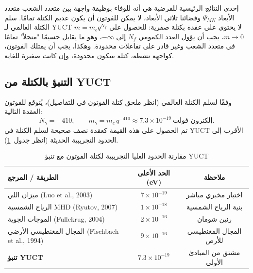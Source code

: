 \documentclass[11pt,a4paper]{article}
\begin{document}
	إحدى النتائج الرئيسية للفرضية هي أنه للوفاء بوظيفة واجهة بين متعدد الشعب متعدد الأبعاد $\Psi_{MN}$ وفضائنا ثلاثي الأبعاد، لا يمكن للفوتون أن يكون عديم الكتلة تمامًا. سلم الكتلة العالمي لـ YUCT $m = m_e q^{N_f}$ لا يحتوي على عقدة بكتلة صفرية: للحصول على $m \to 0$، يجب أن يؤول العدد الكمومي $N_f$ إلى $-\infty$، وهو ما يقابل جسيمًا "منحلاً" تمامًا في متعدد الشعب وغير قادر على تفاعلات محدودة. وهكذا، يجب أن يمتلك الفوتون، كواجهة نشطة، كتلة سكون محدودة، وإن كانت صغيرة للغاية.
	
	\subsection{التنبؤ بالكتلة من YUCT}
	وفقًا لسلم الكتلة العالمي (انظر ملحق كتلة الفوتون في \cite{yuct_zenodo} للتفاصيل)، يُتوقع للفوتون العقدة التالية:
	\begin{equation}
		\boxed{N_\gamma = -410}, \qquad
		\boxed{m_\gamma = m_e \, q^{-410} \approx 7.3 \times 10^{-19}~\text{إلكترون فولت}} .
	\end{equation}
	تم الحصول على هذه القيمة كعقدة نصف صحيحة لسلم الكتلة في YUCT الأقرب إلى الحدود التجريبية الحديثة (انظر جدول~\ref{tab:photon_limits}).
	
	\begin{table}[h!]
		\centering
		\caption{مقارنة الحدود العليا التجريبية لكتلة الفوتون مع تنبؤ YUCT}
		\label{tab:photon_limits}
		\small
		\begin{tabular}{lcc}
			\toprule
			\textbf{الطريقة / المرجع} & \textbf{الحد الأعلى (eV)} & \textbf{ملاحظة} \\
			\midrule
			ميزان اللي (Luo et al., 2003) & $7\times10^{-19}$ & اختبار مخبري مباشر \\
			الرياح الشمسية MHD (Ryutov, 2007) & $1\times10^{-18}$ & بنية الرياح الشمسية \\
			الموجات الجوية (Fullekrug, 2004) & $2\times10^{-16}$ & رنين شومان \\
			المجال المغنطيسي الأرضي (Fischbach et al., 1994) & $9\times10^{-16}$ & المجال المغنطيسي للأرض \\
			\midrule
			\textbf{تنبؤ YUCT} & \textbf{$7.3\times10^{-19}$} & مشتق من المبادئ الأولى \\
			\bottomrule
		\end{tabular}
	\end{table}
	
\end{document}

